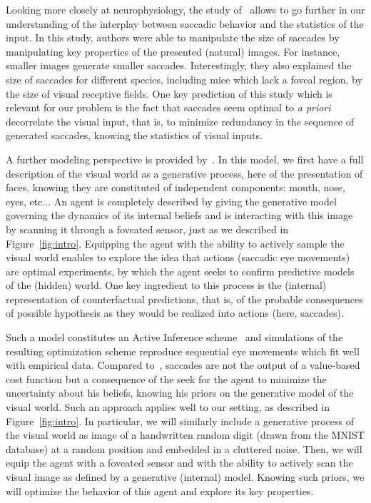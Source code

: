 Looking more closely at neurophysiology, the study of~\citep{Samonds18} allows to go further in our understanding of the interplay between saccadic behavior and the statistics of the input. In this study, authors were able to manipulate the size of saccades by manipulating key properties of the presented (natural) images. For instance, smaller images generate smaller saccades. Interestingly, they also explained the size of saccades for different species, including mice which lack a foveal region, by the size of visual receptive fields. One key prediction of this study which is relevant for our problem is the fact that saccades seem optimal to \emph{a priori} decorrelate the visual input, that is, to minimize redundancy in the sequence of generated saccades, knowing the statistics of visual inputs.

A further modeling perspective is provided by~\citep{Friston12}. In this model, we first have a full description of the visual world as a generative process, here of the presentation of faces, knowing they are constituted of independent components: mouth, nose, eyes, etc... An agent is completely described by giving the generative model governing the dynamics of its internal beliefs and is interacting with this image by scanning it through a foveated sensor, just as we described in Figure~\ref{fig:intro}. Equipping the agent with the ability to actively sample the visual world enables to explore the idea that actions (saccadic eye movements) are optimal experiments, by which the agent seeks to confirm predictive models of the (hidden) world. One key ingredient to this process is the (internal) representation of counterfactual predictions, that is, of the probable consequences of possible hypothesis as they would be realized into actions (here, saccades).

Such a model constitutes an Active Inference scheme~\citep{Mirza18} and simulations of the resulting optimization scheme reproduce sequential eye movements which fit well with empirical data. Compared to~\citet{Najemnik05}, saccades are not the output of a value-based cost function but a consequence of the seek for the agent to minimize the uncertainty about his beliefs, knowing his priors on the generative model of the visual world. Such an approach applies well to our setting, as described in Figure~\ref{fig:intro}. In particular, we will similarly include a generative process of the visual world as image of a handwritten random digit (drawn from the MNIST database) at a random position and embedded in a cluttered noise. Then, we will equip the agent with a foveated sensor and with the ability to actively scan the visual image as defined by a generative (internal) model. Knowing such priors, we will optimize the behavior of this agent and explore its key properties.

